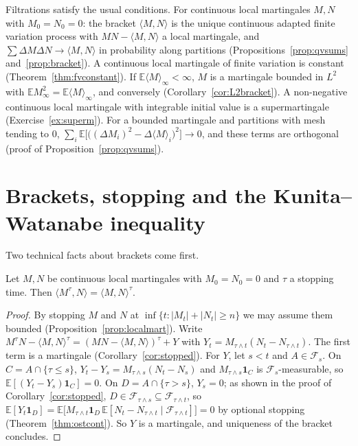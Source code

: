 \begin{reminder}
Filtrations satisfy the usual conditions. For continuous local martingales $M,N$ with $M_0=N_0=0$: the bracket $\langle M,N\rangle$ is the unique continuous adapted finite variation process with
$MN-\langle M,N\rangle$ a local martingale, and $\sum\Delta M\Delta N\to\langle M,N\rangle$ in probability along partitions (Propositions~\ref{prop:qvsums} and~\ref{prop:bracket}). A continuous local martingale of finite
variation is constant (Theorem~\ref{thm:fvconstant}). If $\mathbb E\langle M\rangle_\infty<\infty$, $M$ is a martingale bounded in $L^2$ with $\mathbb EM_\infty^2=\mathbb E\langle M\rangle_\infty$, and conversely
(Corollary~\ref{cor:L2bracket}). A non-negative continuous local martingale with integrable initial value is a supermartingale (Exercise~\ref{ex:superm}). For a bounded martingale and partitions with
mesh tending to $0$, $\sum_i\mathbb E\bigl[\bigl((\Delta M_i)^2-\Delta\langle M\rangle_i\bigr)^2\bigr]\to0$, and these terms are orthogonal (proof of Proposition~\ref{prop:qvsums}).
\end{reminder}

\section{Brackets, stopping and the Kunita--Watanabe inequality}

Two technical facts about brackets come first.

\begin{lemma}\label{lem:bracketstop}
Let $M,N$ be continuous local martingales with $M_0=N_0=0$ and $\tau$ a stopping time. Then $\langle M^\tau,N\rangle=\langle M,N\rangle^\tau$.
\end{lemma}

\begin{proof}
By stopping $M$ and $N$ at $\inf\{t:|M_t|+|N_t|\ge n\}$ we may assume them bounded (Proposition~\ref{prop:localmart}). Write $M^\tau N-\langle M,N\rangle^\tau=(MN-\langle M,N\rangle)^\tau+Y$ with
$Y_t=M_{\tau\wedge t}(N_t-N_{\tau\wedge t})$. The first term is a martingale (Corollary~\ref{cor:stopped}). For $Y$, let $s<t$ and $A\in\mathcal F_s$. On $C=A\cap\{\tau\le s\}$, $Y_t-Y_s=M_{\tau\wedge s}(N_t-N_s)$ and
$M_{\tau\wedge s}\mathbf 1_C$ is $\mathcal F_s$-measurable, so $\mathbb E[(Y_t-Y_s)\mathbf 1_C]=0$. On $D=A\cap\{\tau>s\}$, $Y_s=0$; as shown in the proof of Corollary~\ref{cor:stopped}, $D\in\mathcal F_{\tau\wedge s}\subseteq\mathcal F_{\tau\wedge t}$,
so $\mathbb E[Y_t\mathbf 1_D]=\mathbb E\bigl[M_{\tau\wedge t}\mathbf 1_D\,\mathbb E[N_t-N_{\tau\wedge t}\mid\mathcal F_{\tau\wedge t}]\bigr]=0$ by optional stopping (Theorem~\ref{thm:ostcont}). So $Y$ is a martingale, and uniqueness of
the bracket concludes.
\end{proof}

